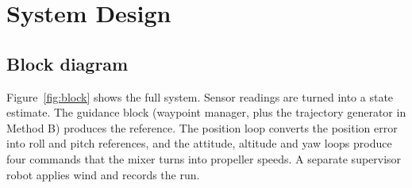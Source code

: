 \section{System Design}
\subsection{Block diagram}
Figure~\ref{fig:block} shows the full system. Sensor readings are turned into a state estimate. The guidance block (waypoint manager, plus the trajectory generator in Method B) produces the reference. The position loop converts the position error into roll and pitch references, and the attitude, altitude and yaw loops produce four commands that the mixer turns into propeller speeds. A separate supervisor robot applies wind and records the run.

